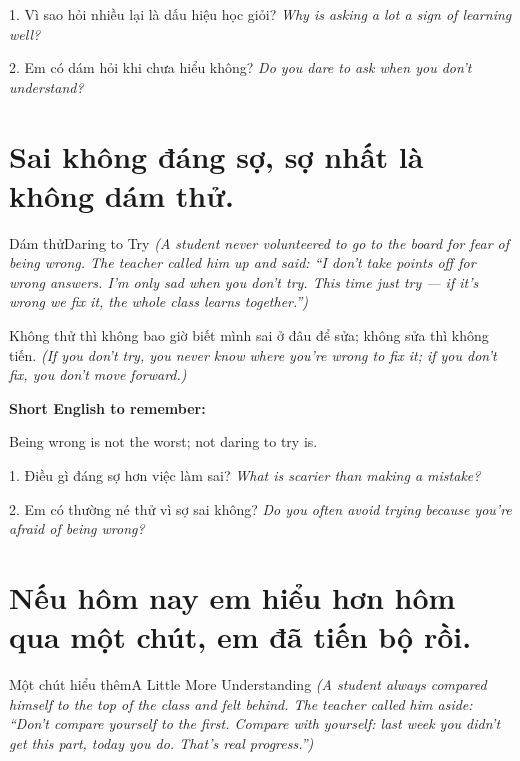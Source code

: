 \begin{tuhocnhanh}
1. Vì sao hỏi nhiều lại là dấu hiệu học giỏi? \textit{Why is asking a lot a sign of learning well?}

2. Em có dám hỏi khi chưa hiểu không? \textit{Do you dare to ask when you don't understand?}
\end{tuhocnhanh}
\ngancach

\section{Sai không đáng sợ, sợ nhất là không dám thử.}
\begin{truyen}{Dám thử}{Daring to Try}
\textit{(A student never volunteered to go to the board for fear of being wrong. The teacher called him up and said: ``I don't take points off for wrong answers. I'm only sad when you don't try. This time just try — if it's wrong we fix it, the whole class learns together.'')}
\end{truyen}

\begin{baihoc}
Không thử thì không bao giờ biết mình sai ở đâu để sửa; không sửa thì không tiến.
\textit{(If you don't try, you never know where you're wrong to fix it; if you don't fix, you don't move forward.)}
\end{baihoc}

\begin{ghinhoanh}
\textbf{Short English to remember:}

Being wrong is not the worst; not daring to try is.

\end{ghinhoanh}

\begin{tuhocnhanh}
1. Điều gì đáng sợ hơn việc làm sai? \textit{What is scarier than making a mistake?}

2. Em có thường né thử vì sợ sai không? \textit{Do you often avoid trying because you're afraid of being wrong?}
\end{tuhocnhanh}
\ngancach

\section{Nếu hôm nay em hiểu hơn hôm qua một chút, em đã tiến bộ rồi.}
\begin{truyen}{Một chút hiểu thêm}{A Little More Understanding}
\textit{(A student always compared himself to the top of the class and felt behind. The teacher called him aside: ``Don't compare yourself to the first. Compare with yourself: last week you didn't get this part, today you do. That's real progress.'')}
\end{truyen}

